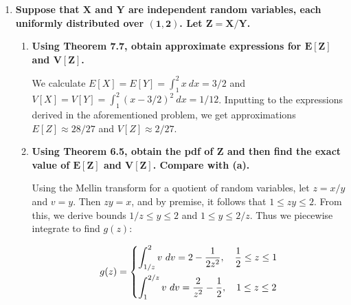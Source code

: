 \documentclass[10pt, oneside]{article}
\begin{document}
\begin{enumerate}[label=7.\arabic*]
  \[ \boxed{ E[Z] \approx \frac{\mu_x}{\mu_y} + \frac{\mu_x}{\mu^3_y} \sigma^2_y } \]
  
  Moreover, $V[Z] \approx \Big( \frac{1}{y} \Big)^2 \sigma^2_x + \Big( -\frac{x}{y^2} \Big)^2 \sigma^2_y$, or at $(\mu_x, \mu_y)$
  
  \[ \boxed{V[Z] = \frac{1}{\mu^2_y} \sigma^2_x + \frac{\mu^2_x}{\mu^4_y} \sigma^2_y } \]

\item  \begin{tcolorbox}[
  colback=Cerulean!5!white,
  colframe=Cerulean!75!black]
  \textbf{Suppose that $\bm{X}$ and $\bm{Y}$ are independent random variables, each uniformly distributed over $\bm{(1,2)}$. Let $\bm{Z = X/Y}$.}
  \end{tcolorbox}
  
  	\begin{enumerate}
	\item  \begin{tcolorbox}[
	  colback=Cerulean!5!white,
	  colframe=Cerulean!75!black]
	  \textbf{Using Theorem 7.7, obtain approximate expressions for $\bm{E[Z]}$ and $\bm{V[Z]}$.}
	  \end{tcolorbox}
	  
	  We calculate $E[X] = E[Y] = \int^2_1 x \ dx = 3/2$ and $V[X] = V[Y] = \int^2_1 (x - 3/2)^2 \ dx = 1/12$. Inputting to the expressions derived in the aforementioned problem, we get approximations $\boxed{E[Z] \approx 28/27}$ and $\boxed{V[Z] \approx 2/27}$.
	  
	\item  \begin{tcolorbox}[
	  colback=Cerulean!5!white,
	  colframe=Cerulean!75!black]
	  \textbf{Using Theorem 6.5, obtain the pdf of $\bm{Z}$ and then find the exact value of $\bm{E[Z]}$ and $\bm{V[Z]}$. Compare with (a).}
	  \end{tcolorbox}
	  
	  Using the Mellin transform for a quotient of random variables, let $z = x/y$ and $v = y$. Then $zy = x$, and by premise, it follows that $1 \leq zy \leq 2$. From this, we derive bounds $1/z \leq y \leq 2$ and $1 \leq y \leq 2/z$. Thus we piecewise integrate to find $g(z)$:
	  
	  \[ g(z) =
	  \begin{dcases}
	  \int^2_{1/z} v \ dv = 2 - \frac{1}{2z^2}, \quad \frac{1}{2} \leq z \leq 1 \\
	  \int^{2/z}_1 v \ dv = \frac{2}{z^2} - \frac{1}{2}, \quad 1 \leq z \leq 2
	  \end{dcases}
	  \]
	  

\end{enumerate}
\end{enumerate}
\end{document}
